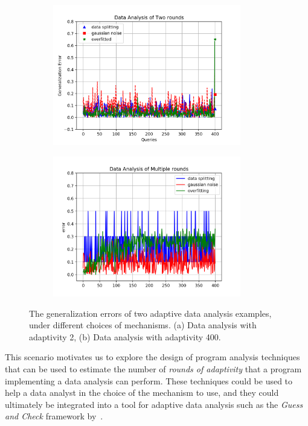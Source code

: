  {\small
 \begin{figure}
 \centering
 \begin{subfigure}{.48\textwidth}
 \begin{centering}
 \includegraphics[width=0.9\textwidth]{figures/tworound.png}
 \caption{}
 \end{centering}
 \end{subfigure}
 \quad
 \begin{subfigure}{.48\textwidth}
 \begin{centering}
 \includegraphics[width=0.9\textwidth]{figures/multipleround.png}
 \caption{}
 \end{centering}
 \end{subfigure}
 \vspace{-0.4cm}
  \caption{
  The generalization errors of two adaptive data analysis examples, under different choices of mechanisms.
  (a) Data analysis with adaptivity 2, 
  (b) Data analysis with adaptivity 400. 
 }
 \label{fig:generalization_errors}
 \vspace{-0.5cm}
 \end{figure}
 }
 This scenario motivates us to explore the design of program analysis techniques that can be used to estimate the number of \emph{rounds of adaptivity} that a program implementing a data analysis can perform. These techniques could be used to help a data analyst in the choice of the mechanism to use,
 and they
 could ultimately be integrated into a tool for adaptive data analysis such as the \emph{Guess and Check} framework by~\cite{RogersRSSTW20}. 

